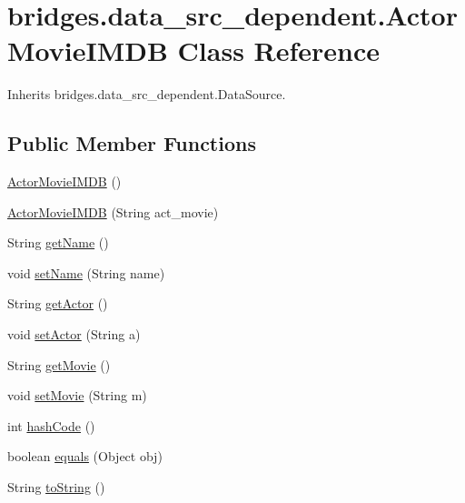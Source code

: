 \hypertarget{classbridges_1_1data__src__dependent_1_1_actor_movie_i_m_d_b}{}\section{bridges.\+data\+\_\+src\+\_\+dependent.\+Actor\+Movie\+I\+M\+D\+B Class Reference}
\label{classbridges_1_1data__src__dependent_1_1_actor_movie_i_m_d_b}


Inherits bridges.\+data\+\_\+src\+\_\+dependent.\+Data\+Source.

\subsection*{Public Member Functions}
\begin{DoxyCompactItemize}
\item 
\hyperlink{classbridges_1_1data__src__dependent_1_1_actor_movie_i_m_d_b_a5265e7b8ba0613497fae0f4125882413}{Actor\+Movie\+I\+M\+D\+B} ()
\item 
\hyperlink{classbridges_1_1data__src__dependent_1_1_actor_movie_i_m_d_b_a4eb000ffd59c6c607c01815273d97110}{Actor\+Movie\+I\+M\+D\+B} (String act\+\_\+movie)
\item 
String \hyperlink{classbridges_1_1data__src__dependent_1_1_actor_movie_i_m_d_b_a4c8151353df4768bb691e1a666884cba}{get\+Name} ()
\item 
void \hyperlink{classbridges_1_1data__src__dependent_1_1_actor_movie_i_m_d_b_abcca7792c68bef1fd8668f6eccf0ab4b}{set\+Name} (String name)
\item 
String \hyperlink{classbridges_1_1data__src__dependent_1_1_actor_movie_i_m_d_b_a59c20f1a3e718ba11fefac6818cf67ee}{get\+Actor} ()
\item 
void \hyperlink{classbridges_1_1data__src__dependent_1_1_actor_movie_i_m_d_b_aa45eca34d84928109ff8439c30e2dd56}{set\+Actor} (String a)
\item 
String \hyperlink{classbridges_1_1data__src__dependent_1_1_actor_movie_i_m_d_b_af44503937d5b0d23a2347e752f435a32}{get\+Movie} ()
\item 
void \hyperlink{classbridges_1_1data__src__dependent_1_1_actor_movie_i_m_d_b_a4747fd2c81481d366d566a6536186d9e}{set\+Movie} (String m)
\item 
int \hyperlink{classbridges_1_1data__src__dependent_1_1_actor_movie_i_m_d_b_a7548f74261dfcff05c95479a2f6b96a8}{hash\+Code} ()
\item 
boolean \hyperlink{classbridges_1_1data__src__dependent_1_1_actor_movie_i_m_d_b_adfc8932fb232734cae5e8521561120c8}{equals} (Object obj)
\item 
String \hyperlink{classbridges_1_1data__src__dependent_1_1_actor_movie_i_m_d_b_a5527848441c0ae19ed9588fb4255b869}{to\+String} ()
\end{DoxyCompactItemize}



